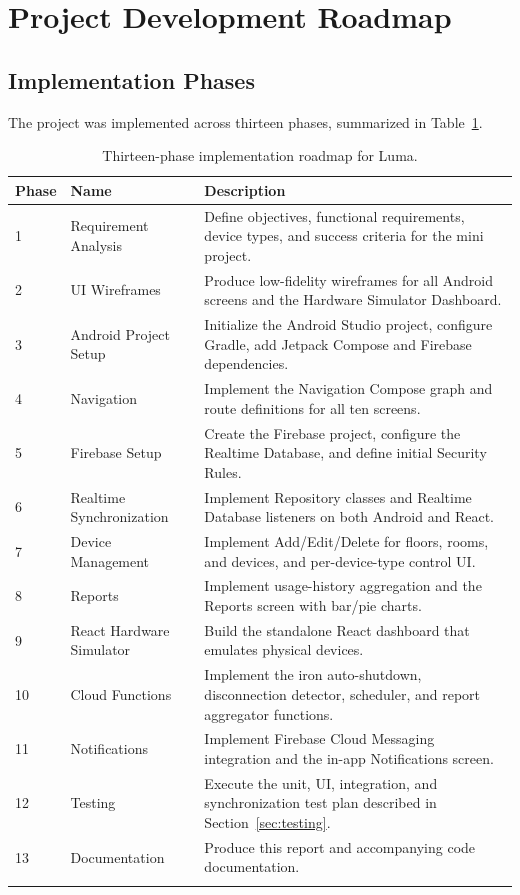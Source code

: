 \documentclass[11pt,a4paper]{article}
\begin{document}
\section{Project Development Roadmap}
\label{sec:roadmap}

\subsection{Implementation Phases}
The project was implemented across thirteen phases, summarized in Table~\ref{tab:roadmap-phases}.

\begin{longtable}{@{}p{2.0cm}p{3.4cm}p{7.8cm}@{}}
\toprule
\textbf{Phase} & \textbf{Name} & \textbf{Description} \\
\midrule
\endhead
1 & Requirement Analysis & Define objectives, functional requirements, device types, and success criteria for the mini project. \\
2 & UI Wireframes & Produce low-fidelity wireframes for all Android screens and the Hardware Simulator Dashboard. \\
3 & Android Project Setup & Initialize the Android Studio project, configure Gradle, add Jetpack Compose and Firebase dependencies. \\
4 & Navigation & Implement the Navigation Compose graph and route definitions for all ten screens. \\
5 & Firebase Setup & Create the Firebase project, configure the Realtime Database, and define initial Security Rules. \\
6 & Realtime Synchronization & Implement Repository classes and Realtime Database listeners on both Android and React. \\
7 & Device Management & Implement Add/Edit/Delete for floors, rooms, and devices, and per-device-type control UI. \\
8 & Reports & Implement usage-history aggregation and the Reports screen with bar/pie charts. \\
9 & React Hardware Simulator & Build the standalone React dashboard that emulates physical devices. \\
10 & Cloud Functions & Implement the iron auto-shutdown, disconnection detector, scheduler, and report aggregator functions. \\
11 & Notifications & Implement Firebase Cloud Messaging integration and the in-app Notifications screen. \\
12 & Testing & Execute the unit, UI, integration, and synchronization test plan described in Section~\ref{sec:testing}. \\
13 & Documentation & Produce this report and accompanying code documentation. \\
\bottomrule
\caption{Thirteen-phase implementation roadmap for Luma.}
\label{tab:roadmap-phases}
\end{longtable}
\end{document}
